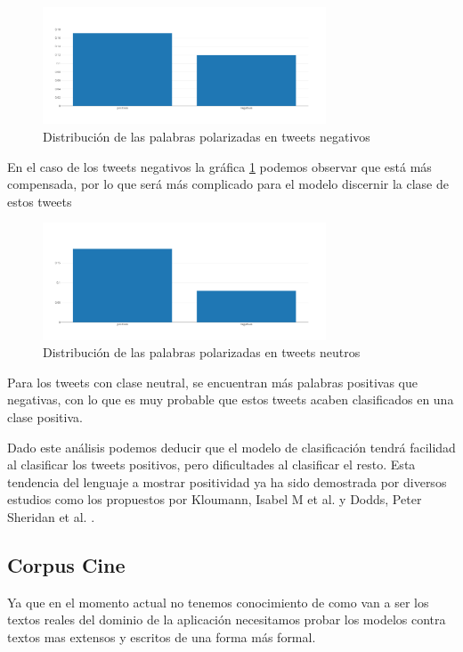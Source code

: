 \begin{figure}[H]
	\centering
	\includegraphics[width=0.75\textwidth]{imaxes/dist_pos_neg_neg.png}
	\caption{Distribución de las palabras polarizadas en tweets negativos}
	\label{dist_neg}
\end{figure}

En el caso de los tweets negativos la gráfica \ref{dist_neg} podemos observar que está más compensada, por lo que será más complicado para el modelo discernir la clase de estos tweets

\begin{figure}[!ht]
	\centering
	\includegraphics[width=0.75\textwidth]{imaxes/dist_pos_neg_neut.png}
	\caption{Distribución de las palabras polarizadas en tweets neutros}
	\label{dist_neut}
\end{figure}

Para los tweets con clase neutral, se encuentran más palabras positivas que negativas, con lo que es muy probable que estos tweets acaben clasificados en una clase positiva.

Dado este análisis podemos deducir que el modelo de clasificación tendrá facilidad al clasificar los tweets positivos, pero dificultades al clasificar el resto. Esta tendencia del lenguaje a mostrar positividad ya ha sido demostrada por diversos estudios como los propuestos por Kloumann, Isabel M et al. \cite{PoeEL} y Dodds, Peter Sheridan et al. \cite{HulPB}.

\subsection{Corpus Cine}

Ya que en el momento actual no tenemos conocimiento de como van a ser los textos reales del dominio de la aplicación necesitamos probar los modelos contra textos mas extensos y escritos de una forma más formal.

